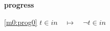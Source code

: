 \textbf{progress}
\begin{block}
\item[ \eqref{m0:prog0} ]$t \in in  \quad \mapsto\quad \neg t \in in $ %
\end{block}
